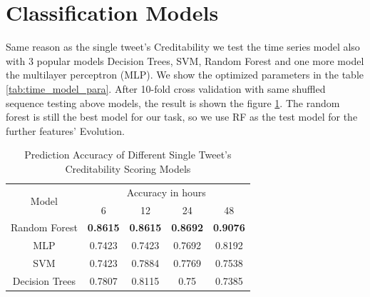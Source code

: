   \section{ Classification Models } 
Same reason as the single tweet's Creditability we test the time series model also with 3 popular models Decision Trees, SVM,  Random Forest and one more model the multilayer perceptron (MLP). We show the optimized parameters in the table \ref{tab:time_model_para}. After 10-fold cross validation with same shuffled sequence  testing above models, the result is shown the figure \ref{tab:time_result}. The random forest is still the best model for our task, so we use RF as the test model for the further features' Evolution.  

\begin{table}[!h]
 \centering
{}
 \caption{Parameters of Classification models}
 \label{tab:time_model_para}
\end{table}


\begin{table}[]
\centering
\begin{tabular}{|c|cccc|}
\hline
\multicolumn{1}{|c|}{\multirow{2}{*}{Model}} & \multicolumn{4}{c|}{Accuracy in hours}                     \\ \cline{2-5} 
\multicolumn{1}{|l|}{}& 6 & 12 & 24 & \multicolumn{1}{c|}{48} \\\hline
 Random Forest  & \textbf{0.8615} &  \textbf{0.8615}  &\textbf{ 0.8692} &  \textbf{0.9076 }\\
MLP & 0.7423  & 0.7423   &   0.7692   &  0.8192 \\
SVM & 0.7423  & 0.7884   &   0.7769   & 0.7538  \\
Decision Trees& 0.7807  & 0.8115   &  0.75 & 0.7385 \\    \bottomrule           
\end{tabular}
 \caption{Prediction Accuracy of Different Single Tweet's Creditability Scoring Models}
 \label{tab:time_result}
\end{table}



